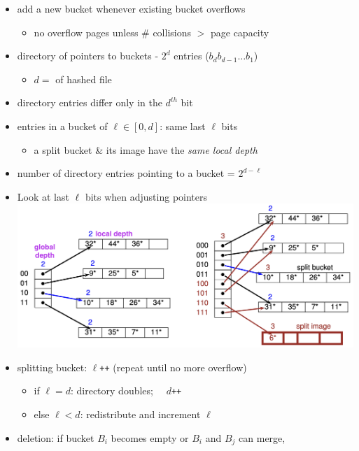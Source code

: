 \documentclass[10pt, landscape]{article}
\begin{document}
\begin{multicols*}{4}
  \begin{itemize}
    \item add a new bucket whenever existing bucket overflows 
      \begin{itemize}
        \item no overflow pages unless \# collisions $>$ page capacity 
      \end{itemize}
    \item directory of pointers to buckets - $2^d$ entries ($b_db_{d-1}\dots b_1$)
      \begin{itemize}
        \item $d=$  of hashed file
      \end{itemize}
    \item {} directory entries differ only in the $d^{th}$ bit
    \item entries in a bucket of  $\ell \in [0,d]$: same last $\ell$ bits
      \begin{itemize}
        \item a split bucket \& its image have the \textit{same local depth}
      \end{itemize}
    \item number of directory entries pointing to a bucket = $2^{d-\ell}$
    \item Look at last $\ell$ bits when adjusting pointers
      \includegraphics[width=0.95\linewidth]{cs3223-extendible-hashing.png} 
    \item splitting bucket: $\ell$\texttt{++} (repeat until no more overflow)
      \begin{itemize}
        \item if $\ell = d$: directory doubles; $\quad d$\texttt{++}
        \item else $\ell < d$: redistribute and increment $\ell$
      \end{itemize}
    \item deletion: if bucket $B_i$ becomes empty or $B_i$ and $B_j$ can merge,

\end{itemize}
\end{multicols*}
\end{document}
